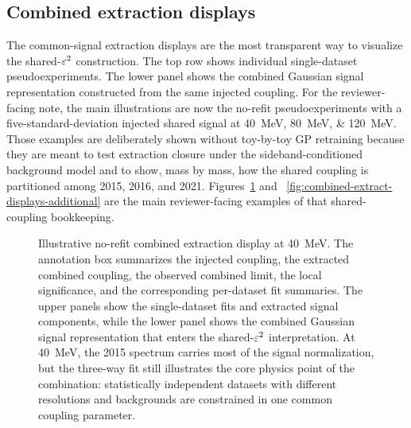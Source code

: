 \subsection{Combined extraction displays}

The common-signal extraction displays are the most transparent way to visualize the
shared-$\varepsilon^2$ construction. The top row shows individual single-dataset
pseudoexperiments. The lower panel shows the combined Gaussian signal representation
constructed from the same injected coupling. For the reviewer-facing note, the main
illustrations are now the no-refit pseudoexperiments with a five-standard-deviation
injected shared signal at \SIlist{40;80;120}{MeV}. Those examples are deliberately
shown without toy-by-toy GP retraining because they are meant to test extraction
closure under the sideband-conditioned background model and to show, mass by mass, how
the shared coupling is partitioned among 2015, 2016, and 2021.
Figures~\ref{fig:combined-extract-displays} and
~\ref{fig:combined-extract-displays-additional} are the main reviewer-facing examples of
that shared-coupling bookkeeping.

\begin{figure}[p]
\centering
{}
\caption{Illustrative no-refit combined extraction display at \SI{40}{MeV}. The
annotation box summarizes the injected coupling, the extracted combined coupling, the
observed combined limit, the local significance, and the corresponding per-dataset fit
summaries. The upper panels show the single-dataset fits and extracted signal
components, while the lower panel shows the combined Gaussian signal representation that
enters the shared-$\varepsilon^2$ interpretation. At \SI{40}{MeV}, the 2015 spectrum carries
most of the signal normalization, but the three-way fit still illustrates the core
physics point of the combination: statistically independent datasets with different
resolutions and backgrounds are constrained in one common coupling parameter.}
\label{fig:combined-extract-displays}
\end{figure}

